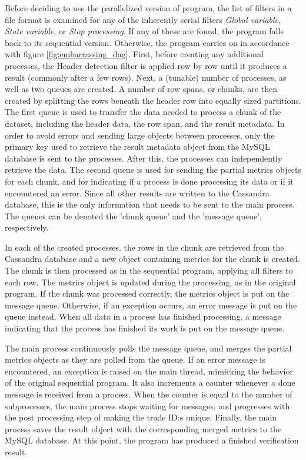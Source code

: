 Before deciding to use the parallelized version of program, the list of filters in a file format is examined for any of the inherently serial filters
\textit{Global variable}, \textit{State variable}, or \textit{Stop processing}. If any of these are found, the
program falls back to its sequential version. Otherwise, the program carries on in accordance with figure \ref{fig:embarrassing_dag}. First, before creating any additional processes, the Header detection filter
is applied row by row until it produces a result (commonly after a few rows). Next, a (tunable) number of processes, as well as two queues are created. A number of row spans, or chunks, are then created by splitting
the rows beneath the header row into equally sized partitions. The first queue is used to transfer the data needed to process a chunk of the dataset, including the header data, the row span, and the result metadata.
In order to avoid errors and sending large objects between processes, only the primary key used to retrieve the result metadata object from the MySQL database is sent to the processes.
After this, the processes can independently retrieve the data. The second queue is used for sending the partial metrics objects for each chunk, and for indicating if a process is done processing
its data or if it encountered an error. Since all other results are written to the Cassandra database, this is the only information that needs to be sent to the main process. The queues can be
denoted the 'chunk queue' and the 'message queue', respectively.

In each of the created processes, the rows in the chunk are retrieved from the Cassandra database and a new object containing metrics for the chunk is created. The chunk is then processed as in the sequential program,
applying all filters to each row. The metrics object is updated during the processing, as in the original program. If the chunk was processed correctly, the metrics object is put on the message queue. Otherwise,
if an exception occurs, an error message is put on the queue instead. When all data in a process has finished processing, a message indicating that the process has finished its work is put on the message queue.

The main process continuously polls the message queue, and merges the partial metrics objects as they are polled from the queue. If an error message is encountered, an exception is raised on the main thread, mimicking the
behavior of the original sequential program. It also increments a counter whenever a done message is received from a process. When the counter is equal to the number of subprocesses, the main process stops waiting
for messages, and progresses with the post processing step of making the trade ID:s unique. Finally, the main process saves the result object with the corresponding merged metrics to the MySQL database. At this point,
the program has produced a finished verification result.

